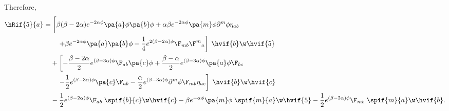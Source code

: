 Therefore,
\begin{align}
  \hRif{5}{a} =& \left.\bigg[\beta(\beta-2\alpha)e^{-2\alpha\phi}\pa{a}\phi\pa{b}\phi + \alpha\beta e^{-2\alpha\phi}\pa{m}\phi\partial^{m}\phi \eta_{a b} \right.\notag\\
    &\quad\left.+ \beta e^{-2\alpha\phi}\pa{a}\pa{b}\phi -\frac{1}{4}e^{2(\beta-2\alpha)\phi}\F_{m b}\F^m{}_a\right]\;\hvif{b}\w\hvif{5}\nonumber\\
 & + \left[-\frac{\beta-2\alpha}{2}e^{(\beta-3\alpha)\phi}\F_{ab}\pa{c}\phi +\frac{\beta-\alpha}{2}e^{(\beta-3\alpha)\phi}\pa{a}\phi \F_{bc}\right.\notag\\
    &\quad\left. - \frac{1}{2}e^{(\beta-3\alpha)\phi}\pa{c} \F_{ab} - \frac{\alpha}{2}e^{(\beta-3\alpha)\phi}\partial^{m}\phi\F_{m b} \eta_{a c}
\right]\;\hvif{b}\w\hvif{c}\nonumber\\
  &  %
- \frac{1}{2}e^{(\beta-2\alpha)\phi}\F_{ab}\; \spif{b}{c}\w\hvif{c} - \beta e^{-\alpha\phi}\pa{m}\phi\;\spif{m}{a}\w\hvif{5} - \frac{1}{2}e^{(\beta-2\alpha)\phi}\F_{m b}\;\spif{m}{a}\w\hvif{b}.
\end{align}

